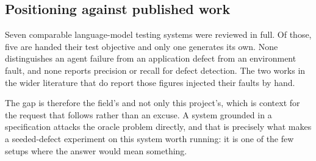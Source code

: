 \subsection{Positioning against published work}
\label{sec:positioning}

Seven comparable language-model testing systems were reviewed in full. Of those,
five are handed their test objective and only one generates its own. None
distinguishes an agent failure from an application defect from an environment
fault, and none reports precision or recall for defect detection. The two works
in the wider literature that do report those figures injected their faults by
hand.

The gap is therefore the field's and not only this project's, which is context
for the request that follows rather than an excuse. A system grounded in a
specification attacks the oracle problem directly, and that is precisely what
makes a seeded-defect experiment on this system worth running: it is one of the
few setups where the answer would mean something.
